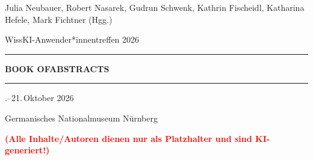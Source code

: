 \begin{titlepage}
\thispagestyle{titelseite}
\begingroup
\centering
\vspace*{2cm}

{\normalsize\sffamily Julia Neubauer, Robert Nasarek, Gudrun Schwenk, Kathrin Fischeidl, Katharina Hefele, Mark Fichtner (Hgg.)\par}

\vspace{1.5cm}

{\LARGE\sffamily WissKI-Anwender*innentreffen 2026\par}


\vfill

{\centering\rule{0.7\linewidth}{2.5pt}\par}
\vspace{0.4em}
{\fontsize{48}{56}\selectfont\sffamily\bfseries BOOK OF\linebreak ABSTRACTS\par}
\vspace{1em}
{\centering\rule{0.7\linewidth}{2.5pt}\par}

\vfill

\vspace{0.5cm}

{\LARGE{}.--21.\,Oktober 2026\par}
{\LARGE\sffamily Germanisches Nationalmuseum Nürnberg\par}

\vspace{1.5cm}

\textcolor{red}{\textbf{(Alle Inhalte/Autoren dienen nur als Platzhalter und sind KI-generiert!)}}

\vspace{0.5cm}
\endgroup
\end{titlepage}
